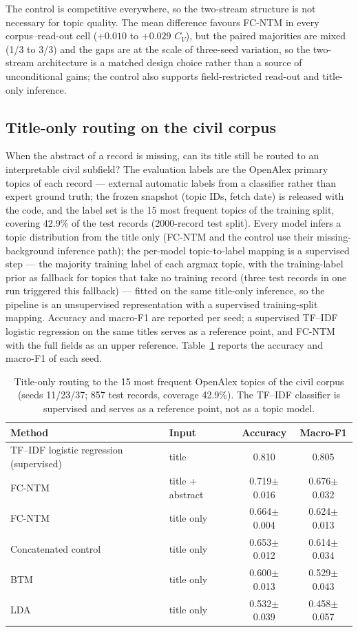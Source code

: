 \documentclass[11pt]{article}
\newcommand{\fcntm}{FC-NTM}
\begin{document}
The control is competitive everywhere, so the two-stream structure is not necessary for topic
quality. The mean difference favours \fcntm{} in every corpus--read-out cell ($+0.010$ to
$+0.029$ $C_V$), but the paired majorities are mixed (1/3 to 3/3) and the gaps are at the scale of
three-seed variation, so the two-stream architecture is a matched design choice rather than a
source of unconditional gains; the control also supports field-restricted read-out and title-only
inference.

\subsection{Title-only routing on the civil corpus}

When the abstract of a record is missing, can its title still be routed to an interpretable civil
subfield? The evaluation labels are the OpenAlex primary topics of each record --- external
automatic labels from a classifier rather than expert ground truth; the frozen snapshot (topic
IDs, fetch date) is released with the code, and the label set is the 15 most frequent topics of
the training split, covering 42.9\% of the test records (2000-record test split). Every model
infers a topic distribution from the title only (\fcntm{} and the control use their
missing-background inference path); the per-model topic-to-label mapping is a supervised step ---
the majority training label of each argmax topic, with the training-label prior as fallback for
topics that take no training record (three test records in one run triggered this fallback) ---
fitted on the same title-only inference, so the pipeline is an unsupervised representation with
a supervised training-split mapping. Accuracy and
macro-F1 are reported per seed; a supervised TF--IDF logistic regression on the same titles
serves as a reference point, and \fcntm{} with the full fields as an upper reference.
Table~\ref{tab:archival} reports the accuracy and macro-F1 of each seed.

\begin{table}[t]
\centering
\caption{Title-only routing to the 15 most frequent OpenAlex topics of the civil corpus (seeds 11/23/37; 857 test records, coverage 42.9\%). The TF--IDF classifier is supervised and serves as a reference point, not as a topic model.}
\label{tab:archival}
\small
\begin{tabular}{llcc}
\toprule
Method & Input & Accuracy & Macro-F1 \\
\midrule
TF--IDF logistic regression (supervised) & title & 0.810 & 0.805 \\
\fcntm{} & title + abstract & 0.719$\pm$0.016 & 0.676$\pm$0.032 \\
\fcntm{} & title only & 0.664$\pm$0.004 & 0.624$\pm$0.013 \\
Concatenated control & title only & 0.653$\pm$0.012 & 0.614$\pm$0.034 \\
BTM & title only & 0.600$\pm$0.013 & 0.529$\pm$0.043 \\
LDA & title only & 0.532$\pm$0.039 & 0.458$\pm$0.057 \\
\bottomrule
\end{tabular}
\end{table}
\end{document}
